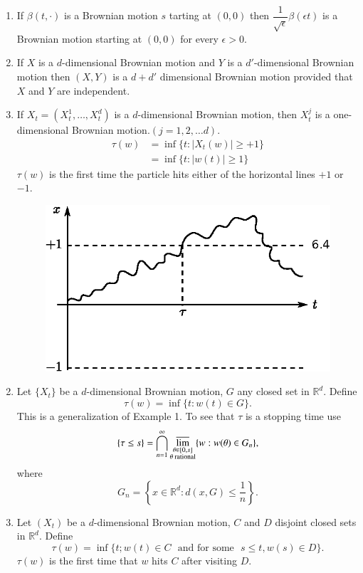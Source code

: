 \begin{exer*}
\begin{enumerate}
\renewcommand{\theenumi}{\alph{enumi}}
\renewcommand{\labelenumi}{(\theenumi)}
\item If $\beta(t,\cdot)$ is a Brownian motion $s$ tarting at $(0,0)$
  then $\dfrac{1}{\sqrt{\epsilon}}\beta(\epsilon t)$ is a Brownian
  motion starting at $(0,0)$ for every $\epsilon>0$.

\item If $X$ is a $d$-dimensional Brownian motion and $Y$ is a
  $d'$-dimensio\-nal Brownian motion then $(X,Y)$ is a $d+d'$
  dimensional Brownian motion provided that $X$ and $Y$ are
  independent.

\item If $X_{t}=(X^{1}_{t},\ldots,X^{d}_{t})$ is a $d$-dimensional
  Brownian motion, then $X^{j}_{t}$ is a one-dimensional Brownian
  motion.\quad $(j=1,2,\ldots d)$.
\begin{align*}
\tau(w) &= \inf\{t:|X_{t}(w)|\geq +1\}\\
&= \inf\{t:|w(t)|\geq 1\}
\end{align*}\pageoriginale
$\tau(w)$ is the first time the particle hits either of the horizontal
lines $+1$ or $-1$.
\begin{figure}[H]
\centering
\includegraphics{figure/fig4.eps}
\end{figure}
\end{enumerate}

\begin{enumerate}
\setcounter{enumi}{1}
\item Let $\{X_{t}\}$ be a $d$-dimensional Brownian motion, $G$ any
  closed set in $\mathbb{R}^{d}$. Define
$$
\tau(w)=\inf\{t:w(t)\in G\}.
$$
This is a generalization of Example 1. To see that $\tau$ is a
stopping time use
$$
\{\tau\leq
s\}=\bigcap^{\infty}_{n=1}{\displaystyle{\mathop{\varlimsup}_{\substack{\theta\in
[0,s]\\ \theta\text{~ rational}}}}}\{w:w(\theta)\in G_{n}\},
$$
where
$$
G_{n}=\left\{x\in \mathbb{R}^{d}:d(x,G)\leq \frac{1}{n}\right\}.
$$

\item Let $(X_{t})$ be a $d$-dimensional Brownian motion, $C$ and $D$
  disjoint closed sets in $\mathbb{R}^{d}$. Define
$$
\tau(w)=\inf\{t;w(t)\in C\text{~ and for some~ }s\leq t,w(s)\in D\}.
$$
$\tau(w)$ is the first time that $w$ hits $C$ after visiting $D$.
\end{enumerate}
\end{exer*}


